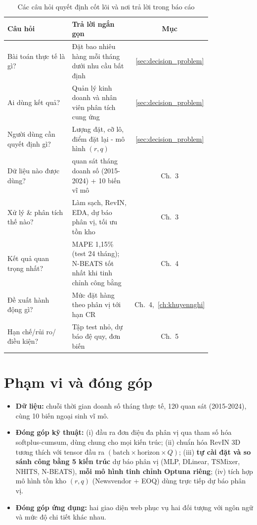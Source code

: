 \documentclass[12pt, a4paper]{report}
\newcommand{\CR}{\ensuremath{\mathrm{CR}}}
\begin{document}
\begin{table}[H]
\centering
\caption{Các câu hỏi quyết định cốt lõi và nơi trả lời trong báo cáo}
\label{tab:questions}
\renewcommand{\arraystretch}{1.3}
\begin{tabular}{|>{\raggedright\arraybackslash}p{0.42\linewidth}|>{\raggedright\arraybackslash}p{0.40\linewidth}|c|}
\hline
\rowcolor{gray!18}
\textbf{Câu hỏi} & \textbf{Trả lời ngắn gọn} & \textbf{Mục} \\
\hline
Bài toán thực tế là gì? & Đặt bao nhiêu hàng mỗi tháng dưới nhu cầu bất định & \ref{sec:decision_problem} \\
\hline
Ai dùng kết quả? & Quản lý kinh doanh và nhân viên phân tích cung ứng & \ref{sec:decision_problem} \\
\hline
Người dùng cần quyết định gì? & Lượng đặt, cỡ lô, điểm đặt lại - mô hình $(r,q)$ & \ref{sec:decision_problem} \\
\hline
Dữ liệu nào được dùng? & 120 quan sát tháng doanh số (2015-2024) + 10 biến vĩ mô & Ch.~3 \\
\hline
Xử lý \& phân tích thế nào? & Làm sạch, RevIN, EDA, dự báo phân vị, tối ưu tồn kho & Ch.~3 \\
\hline
Kết quả quan trọng nhất? & MAPE 1,15\% (test 24 tháng); N-BEATS tốt nhất khi tinh chỉnh công bằng & Ch.~4 \\
\hline
Đề xuất hành động gì? & Mức đặt hàng theo phân vị tới hạn $\CR$ & Ch.~4,~\ref{ch:khuyennghi} \\
\hline
Hạn chế/rủi ro/điều kiện? & Tập test nhỏ, dự báo đệ quy, đơn biến & Ch.~5 \\
\hline
\end{tabular}
\end{table}

\section{Phạm vi và đóng góp}

\begin{itemize}
  \item \textbf{Dữ liệu:} chuỗi thời gian doanh số tháng thực tế, 120 quan sát (2015-2024), cùng 10 biến ngoại sinh vĩ mô.
  \item \textbf{Đóng góp kỹ thuật:} (i) đầu ra đơn điệu đa phân vị qua tham số hóa softplus-cumsum, dùng chung cho mọi kiến trúc; (ii) chuẩn hóa RevIN 3D tương thích với tensor đầu ra $(\text{batch} \times \text{horizon} \times Q)$; (iii) \textbf{tự cài đặt và so sánh công bằng 5 kiến trúc} dự báo phân vị (MLP, DLinear, TSMixer, NHITS, N-BEATS), \textbf{mỗi mô hình tinh chỉnh Optuna riêng}; (iv) tích hợp mô hình tồn kho $(r,q)$ (Newsvendor + EOQ) dùng trực tiếp dự báo phân vị.
  \item \textbf{Đóng góp ứng dụng:} hai giao diện web phục vụ hai đối tượng với ngôn ngữ và mức độ chi tiết khác nhau.
\end{itemize}
\end{document}

